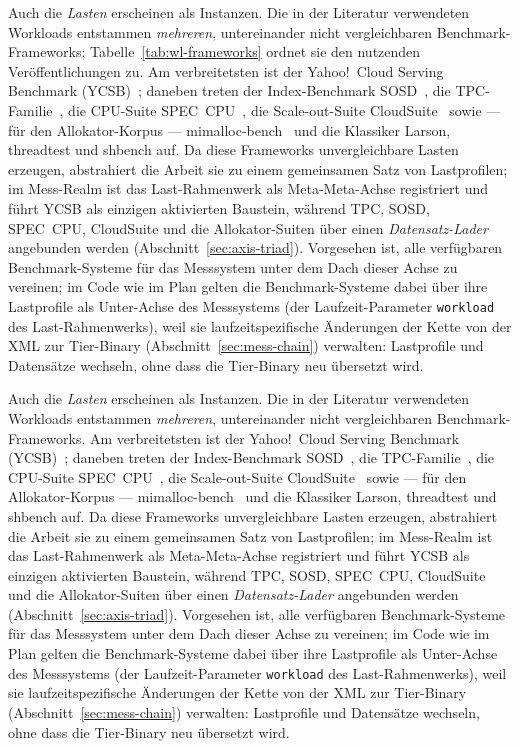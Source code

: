 \begin{nurlang}
Auch die \emph{Lasten} erscheinen als Instanzen. Die in der Literatur verwendeten Workloads entstammen
\emph{mehreren}, untereinander nicht vergleichbaren Benchmark-Frameworks; Tabelle~\ref{tab:wl-frameworks}
ordnet sie den nutzenden Veröffentlichungen zu. Am verbreitetsten ist der Yahoo!\ Cloud Serving Benchmark
(YCSB)~\cite{cooper2010ycsb}; daneben treten der Index-Benchmark SOSD~\cite{kipf2019sosd}, die
TPC-Familie~\cite{tpc_benchmarks}, die CPU-Suite SPEC~CPU~\cite{spec_cpu2017}, die Scale-out-Suite
CloudSuite~\cite{ferdman2012cloudsuite} sowie --- für den Allokator-Korpus ---
mimalloc-bench~\cite{mimalloc_bench} und die Klassiker Larson, threadtest und shbench auf. Da diese
Frameworks unvergleichbare Lasten erzeugen, abstrahiert die Arbeit sie zu einem gemeinsamen Satz von
Lastprofilen; im Mess-Realm ist das Last-Rahmenwerk als Meta-Meta-Achse registriert und führt YCSB als
einzigen aktivierten Baustein, während TPC, SOSD, SPEC~CPU, CloudSuite und die Allokator-Suiten
über einen \emph{Datensatz-Lader} angebunden werden (Abschnitt~\ref{sec:axis-triad}).
Vorgesehen ist, alle verfügbaren Benchmark-Systeme für das Messsystem unter dem Dach dieser Achse zu
vereinen; im Code wie im Plan gelten die Benchmark-Systeme dabei über ihre Lastprofile als Unter-Achse des
Messsystems (der Laufzeit-Parameter \texttt{workload} des Last-Rahmenwerks), weil sie laufzeitspezifische
Änderungen der Kette von der XML zur Tier-Binary (Abschnitt~\ref{sec:mess-chain}) verwalten: Lastprofile und
Datensätze wechseln, ohne dass die Tier-Binary neu übersetzt wird.
\end{nurlang}
\begin{nurkurz}
Auch die \emph{Lasten} erscheinen als Instanzen. Die in der Literatur verwendeten Workloads entstammen
\emph{mehreren}, untereinander nicht vergleichbaren Benchmark-Frameworks. Am verbreitetsten ist der Yahoo!\ Cloud
Serving Benchmark
(YCSB)~\cite{cooper2010ycsb}; daneben treten der Index-Benchmark SOSD~\cite{kipf2019sosd}, die
TPC-Familie~\cite{tpc_benchmarks}, die CPU-Suite SPEC~CPU~\cite{spec_cpu2017}, die Scale-out-Suite
CloudSuite~\cite{ferdman2012cloudsuite} sowie --- für den Allokator-Korpus ---
mimalloc-bench~\cite{mimalloc_bench} und die Klassiker Larson, threadtest und shbench auf. Da diese
Frameworks unvergleichbare Lasten erzeugen, abstrahiert die Arbeit sie zu einem gemeinsamen Satz von
Lastprofilen; im Mess-Realm ist das Last-Rahmenwerk als Meta-Meta-Achse registriert und führt YCSB als
einzigen aktivierten Baustein, während TPC, SOSD, SPEC~CPU, CloudSuite und die Allokator-Suiten
über einen \emph{Datensatz-Lader} angebunden werden (Abschnitt~\ref{sec:axis-triad}).
Vorgesehen ist, alle verfügbaren Benchmark-Systeme für das Messsystem unter dem Dach dieser Achse zu
vereinen; im Code wie im Plan gelten die Benchmark-Systeme dabei über ihre Lastprofile als Unter-Achse des
Messsystems (der Laufzeit-Parameter \texttt{workload} des Last-Rahmenwerks), weil sie laufzeitspezifische
Änderungen der Kette von der XML zur Tier-Binary (Abschnitt~\ref{sec:mess-chain}) verwalten: Lastprofile und
Datensätze wechseln, ohne dass die Tier-Binary neu übersetzt wird.
\end{nurkurz}

